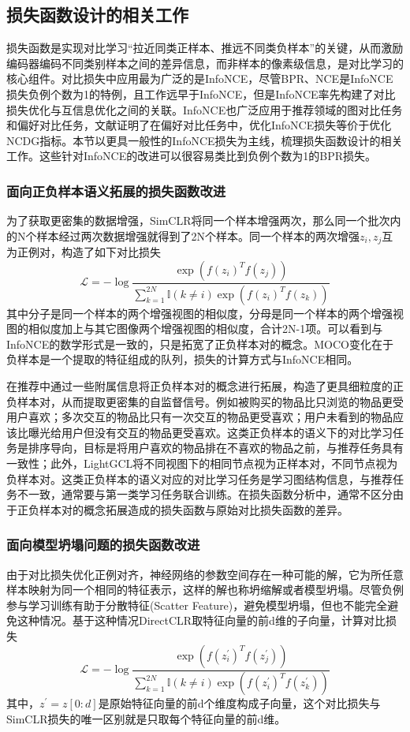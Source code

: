 \subsection{损失函数设计的相关工作}
损失函数是实现对比学习“拉近同类正样本、推远不同类负样本”的关键，从而激励编码器编码不同类别样本之间的差异信息，而非样本的像素级信息，是对比学习的核心组件。对比损失中应用最为广泛的是InfoNCE\cite{Oord:2018:arxiv}，尽管BPR\cite{Steffen:2009:UAI}、NCE\cite{Gutmann:2010:ICAIS}是InfoNCE损失负例个数为1的特例，且工作远早于InfoNCE，但是InfoNCE率先构建了对比损失优化与互信息优化之间的关联。InfoNCE也广泛应用于推荐领域的图对比任务和偏好对比任务，文献\cite{Jiancan:2022:arxiv}证明了在偏好对比任务中，优化InfoNCE损失等价于优化NCDG指标。本节以更具一般性的InfoNCE损失为主线，梳理损失函数设计的相关工作。这些针对InfoNCE的改进可以很容易类比到负例个数为1的BPR损失。
\subsubsection{面向正负样本语义拓展的损失函数改进}
为了获取更密集的数据增强，SimCLR\cite{Chen:2020:ICML}将同一个样本增强两次，那么同一个批次内的N个样本经过两次数据增强就得到了2N个样本。同一个样本的两次增强$z_i,z_j$互为正例对，构造了如下对比损失
\[
\mathcal{L} = -\log \frac{\exp(f(z_i)^Tf(z_j))}{\sum_{k=1}^{2N}\mathbb I (k \neq i)\exp(f(z_i)^Tf(z_k))}
\]
其中分子是同一个样本的两个增强视图的相似度，分母是同一个样本的两个增强视图的相似度加上与其它图像两个增强视图的相似度，合计2N-1项。可以看到与InfoNCE的数学形式是一致的，只是拓宽了正负样本对的概念。MOCO\cite{He:2020:CVPR}变化在于负样本是一个提取的特征组成的队列，损失的计算方式与InfoNCE相同。

在推荐中通过一些附属信息将正负样本对的概念进行拓展，构造了更具细粒度的正负样本对，从而提取更密集的自监督信号。例如被购买的物品比只浏览的物品更受用户喜欢\cite{Qiu:2018:IS}；多次交互的物品比只有一次交互的物品更受喜欢\cite{Lerche:2014:RS}；用户未看到的物品应该比曝光给用户但没有交互的物品更受喜欢\cite{Wenhui:2019:WWW,Yu:2018:CIKM,Bin:2020:IS}。这类正负样本的语义下的对比学习任务是排序导向，目标是将用户喜欢的物品排在不喜欢的物品之前，与推荐任务具有一致性；此外，LightGCL\cite{lightgcl:2023:ICLR}将不同视图下的相同节点视为正样本对，不同节点视为负样本对。这类正负样本的语义对应的对比学习任务是学习图结构信息，与推荐任务不一致，通常要与第一类学习任务联合训练。在损失函数分析中，通常不区分由于正负样本对的概念拓展造成的损失函数与原始对比损失函数的差异。

\subsubsection{面向模型坍塌问题的损失函数改进}
由于对比损失优化正例对齐，神经网络的参数空间存在一种可能的解，它为所任意样本映射为同一个相同的特征表示，这样的解也称坍缩解或者模型坍塌\cite{jing2021understanding}。尽管负例参与学习训练有助于分散特征(Scatter Feature)，避免模型坍塌，但也不能完全避免这种情况。基于这种情况DirectCLR\cite{jing2021understanding}取特征向量的前d维的子向量，计算对比损失
\[
\mathcal{L} = -\log \frac{\exp(f(z_i^\prime)^Tf(z_j^\prime))}{\sum_{k=1}^{2N}\mathbb I (k \neq i)\exp(f(z_i^\prime)^Tf(z_k^\prime))}
\]
其中，$z^\prime = z[0:d]$是原始特征向量的前d个维度构成子向量，这个对比损失与SimCLR损失的唯一区别就是只取每个特征向量的前d维。

